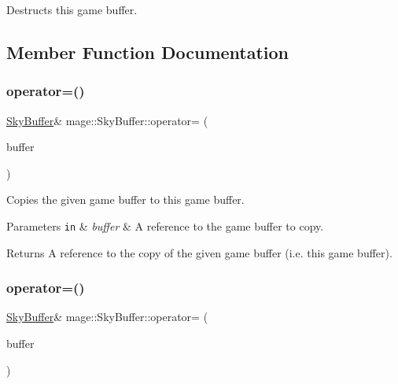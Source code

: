 Destructs this game buffer. 

\subsection{Member Function Documentation}
\hypertarget{structmage_1_1_sky_buffer_a537fb2efe24495b1c84d683437759e93}{}\label{structmage_1_1_sky_buffer_a537fb2efe24495b1c84d683437759e93} 
\subsubsection{\texorpdfstring{operator=()}{operator=()}\hspace{0.1cm}{\footnotesize\ttfamily [1/2]}}
{\footnotesize\ttfamily \hyperlink{structmage_1_1_sky_buffer}{Sky\+Buffer}\& mage\+::\+Sky\+Buffer\+::operator= (\begin{DoxyParamCaption}\item[{const \hyperlink{structmage_1_1_sky_buffer}{Sky\+Buffer} \&}]{buffer }\end{DoxyParamCaption})\hspace{0.3cm}{\ttfamily [default]}}

Copies the given game buffer to this game buffer.


\begin{DoxyParams}[1]{Parameters}
\mbox{\tt in}  & {\em buffer} & A reference to the game buffer to copy. \\
\hline
\end{DoxyParams}
\begin{DoxyReturn}{Returns}
A reference to the copy of the given game buffer (i.\+e. this game buffer). 
\end{DoxyReturn}
\hypertarget{structmage_1_1_sky_buffer_a8210a03487bdc44694fef925bb85ed71}{}\label{structmage_1_1_sky_buffer_a8210a03487bdc44694fef925bb85ed71} 
\subsubsection{\texorpdfstring{operator=()}{operator=()}\hspace{0.1cm}{\footnotesize\ttfamily [2/2]}}
{\footnotesize\ttfamily \hyperlink{structmage_1_1_sky_buffer}{Sky\+Buffer}\& mage\+::\+Sky\+Buffer\+::operator= (\begin{DoxyParamCaption}\item[{\hyperlink{structmage_1_1_sky_buffer}{Sky\+Buffer} \&\&}]{buffer }\end{DoxyParamCaption})\hspace{0.3cm}{\ttfamily [default]}}

